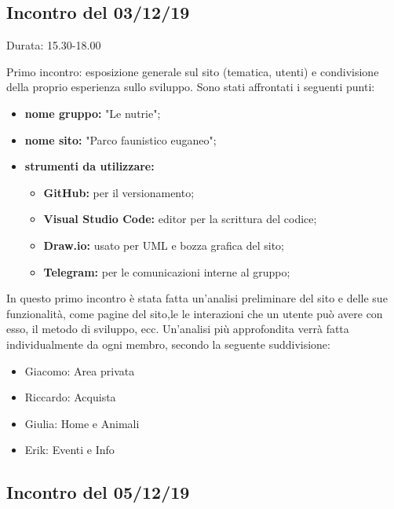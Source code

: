 \subsection{Incontro del 03/12/19}
    Durata: 15.30-18.00

    Primo incontro: esposizione generale sul sito (tematica, utenti) e condivisione della proprio esperienza sullo sviluppo.
    Sono stati affrontati i seguenti punti:
    
    \begin{itemize}
        \item \textbf{nome gruppo:} "Le nutrie"; 
        \item \textbf{nome sito:} "Parco faunistico euganeo"; 
        \item \textbf{strumenti da utilizzare:}
            \begin{itemize}
                \item \textbf{GitHub:} per il versionamento; 
                \item \textbf{Visual Studio Code:} editor per la scrittura del codice; 
                \item \textbf{Draw.io:} usato per UML e bozza grafica del sito;
                \item \textbf{Telegram:} per le comunicazioni interne al gruppo;
            \end{itemize}
    \end{itemize}

    In questo primo incontro è stata fatta un'analisi preliminare del sito e delle sue funzionalità, come pagine del sito,le
    le interazioni che un utente può avere con esso, il metodo di sviluppo, ecc.
    Un'analisi più approfondita verrà fatta individualmente da ogni membro, secondo la seguente suddivisione:
    \begin{itemize}
        \item Giacomo: Area privata
        \item Riccardo: Acquista
        \item Giulia: Home e Animali
        \item Erik: Eventi e Info
    \end{itemize}

\subsection{Incontro del 05/12/19}